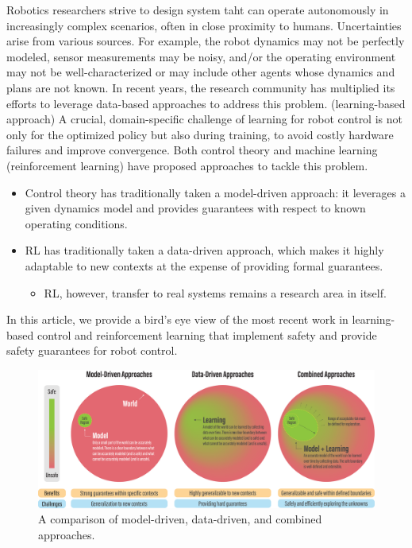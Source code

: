 \documentclass{article}
\begin{document}
Robotics researchers strive to design system taht can operate autonomously in increasingly complex scenarios, often in close proximity to humans.
Uncertainties arise from various sources.
For example, the robot dynamics may not be perfectly modeled, sensor measurements may be noisy, and/or the operating environment may not be well-characterized or may include other agents whose dynamics and plans are not known.
In recent years, the research community has multiplied its efforts to leverage data-based approaches to address this problem. (learning-based approach)
A crucial, domain-specific challenge of learning for robot control is not only for the optimized policy but also during training, to avoid costly hardware failures and improve convergence.
Both control theory and machine learning (reinforcement learning) have proposed approaches to tackle this problem.
\begin{itemize}
    \item Control theory has traditionally taken a model-driven approach: it leverages a given dynamics model and provides guarantees with respect to known operating conditions.
    \item RL has traditionally taken a data-driven approach, which makes it highly adaptable to new contexts at the expense of providing formal guarantees.
    \begin{itemize}
        \item RL, however, transfer to real systems remains a research area in itself.
    \end{itemize}
\end{itemize}
In this article, we provide a bird's eye view of the most recent work in learning-based control and reinforcement learning that implement safety and provide safety guarantees for robot control.
\begin{figure}[h]
    \centering
    \includegraphics[width=1.0\textwidth]{imgs/problem_illustration.pdf}
    \caption{A comparison of model-driven, data-driven, and combined approaches.}
\end{figure}
\end{document}
